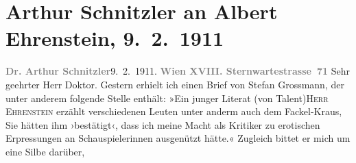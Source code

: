 

         
         \renewcommand{\erwaehntePersonen}{Personen: Albert Ehrenstein, Stefan Großmann, Karl Kraus}
         \renewcommand{\erwaehnteInstitutionen}{Institutionen: Die Fackel}
         \renewcommand{\erwaehnteOrte}{Orte: Sternwartestraße 71, Wien}
         \renewcommand{\erwaehnteWerke}{}
               \section[Arthur Schnitzler an Albert Ehrenstein, 9. 2. 1911]{ Arthur Schnitzler an Albert Ehrenstein, 9. 2. 1911}\nopagebreak{}\rehead{ }\begin{ledgroupsized}[t]{13cm}\normalsize\beginnumbering{} \toendnotes[C]{\smallbreak\pagebreak[2]} 
\pstart
           {\pb}\textcolor{gray}{\textbf{Dr. Arthur Schnitzler}}\hfill 9. 2. 1911.\pend
           \pstart
           \textcolor{gray}{\textbf{Wien XVIII. Sternwartestrasse 71}}\pend
           \pstart{}Sehr geehrter Herr Doktor.\pend\pstart
           Gestern erhielt ich einen Brief von Stefan
                  Grossmann, der unter anderem folgende Stelle enthält: »Ein junger Literat
                  \introOben{}(\introOben{}von Talent\introOben{})\introOben{}{ }\introOben{}\textsc{Herr Ehrenstein}\introOben{} erzählt verschiedenen Leuten unter anderm auch dem Fackel-Kraus, Sie hätten
               ihm ›bestätigt‹, dass ich meine Macht als Kritiker zu erotischen Erpressungen an
               Schauspielerinnen ausgenützt hätte.« Zugleich bittet er mich um eine Silbe darüber,

\end{ledgroupsized}
